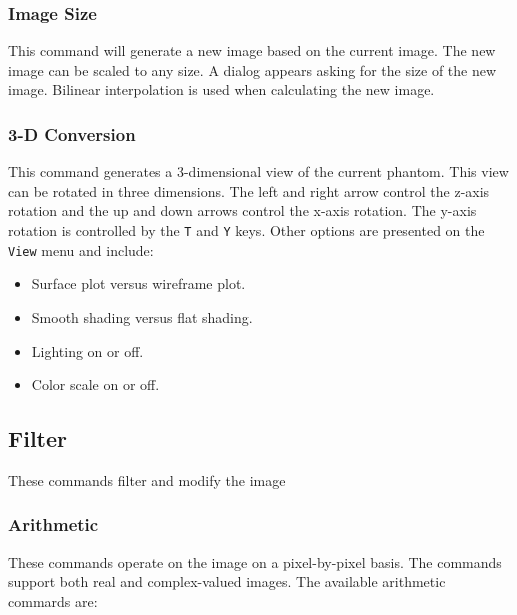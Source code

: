 \subsubsection{Image Size}
This command will generate a new image based on the current image. The new
image can be scaled to any size. A dialog
appears asking for the size of the new image. Bilinear interpolation
is used when calculating the new image.

\subsubsection{3-D Conversion}
This command generates a 3-dimensional view of the current phantom. This view can be
rotated in three dimensions. The left and right arrow control the z-axis
rotation and the up and down arrows control the x-axis rotation. The y-axis
rotation is controlled by the \texttt{T} and \texttt{Y} keys. Other options
are presented on the \texttt{View} menu and include:

\begin{itemize}\itemsep=0pt
\item Surface plot versus wireframe plot.
\item Smooth shading versus flat shading.
\item Lighting on or off.
\item Color scale on or off.
\end{itemize}

\subsection{Filter}
These commands filter and modify the image

\subsubsection{Arithmetic}
These commands operate on the image on a pixel-by-pixel basis. The commands
support both real and complex-valued images. The available arithmetic commards are:

\begin{twocollist}
\end{twocollist}


